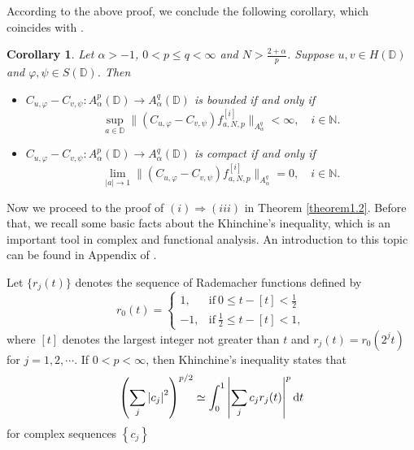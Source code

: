 \documentclass[preprint,12pt,times]{elsarticle}
\newtheorem{corollary}[theorem]{Corollary}
\theoremstyle{definition}
\theoremstyle{remark}
\numberwithin{equation}{section}
\begin{document}
According to the above proof, we conclude the following corollary, which coincides with \cite[Theorem 1.1]{3}.

\begin{corollary}
Let $\alpha>-1$, $0<p\leq q<\infty$ and $N>\frac{2+\alpha}{p}$. Suppose $u,v\in H(\mathbb{D})$ and $\varphi,\psi\in S(\mathbb{D})$. Then
\begin{itemize}
\item[(i)] $C_{u,\varphi}-C_{v,\psi}: A_{\alpha}^p(\mathbb{D})\to A_{\alpha}^q(\mathbb{D})$ is bounded if and only if 
\begin{equation*}
\sup_{a\in\mathbb{D}}\|(C_{u,\varphi}-C_{v,\psi})f_{a,N,p}^{[i]}\|_{A_{\alpha}^q}<\infty, \quad i\in \mathbb{N}.
\end{equation*}
\item[(ii)] 
$C_{u,\varphi}-C_{v,\psi}: A_{\alpha}^p(\mathbb{D})\to A_{\alpha}^q(\mathbb{D})$ is compact if and only if 
\begin{equation*}
\lim_{|a|\to 1}\|(C_{u,\varphi}-C_{v,\psi})f_{a,N,p}^{[i]}\|_{A_{\alpha}^q}=0, \quad i\in \mathbb{N}.
\end{equation*}
\end{itemize}
\end{corollary}

Now we proceed to the proof of $(i)\Rightarrow (iii)$ in Theorem \ref{theorem1.2}. Before that, we recall some basic facts about the Khinchine's inequality, which is an important tool in complex and functional analysis. An introduction to this topic can be found in Appendix of \cite{12}.

Let $\{r_j(t)\}$ denotes the sequence of Rademacher functions defined by
$$r_0(t)=\begin{cases}1, &\mbox{if}\ 0\leq t-[t]<\frac{1}{2}\\-1, &\mbox{if}\ \frac{1}{2}\leq t-[t]<1,\end{cases}$$ 
where $[t]$ denotes the largest integer not greater than $t$ and $r_j(t)=r_0(2^jt)$ for $j=1, 2,\cdots$.
If $0<p<\infty$, then Khinchine's inequality states that
$$\left(\sum_{j}\left|c_{j}\right|^{2}\right)^{p / 2} \simeq \int_{0}^{1}\left|\sum_{j} c_{j} r_{j}(t)\right|^{p} {\rm d}t$$
for complex sequences $\left\{c_{j}\right\}$
\end{document}
